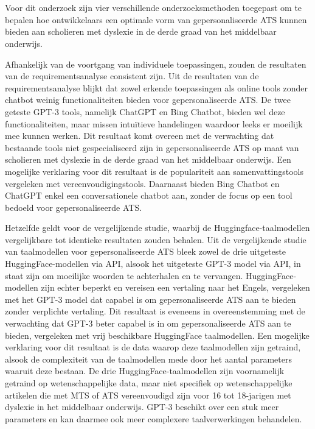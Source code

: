 
\chapter{}%
\label{ch:discussie}




Voor dit onderzoek zijn vier verschillende onderzoeksmethoden toegepast om te bepalen hoe ontwikkelaars een optimale vorm van gepersonaliseerde ATS kunnen bieden aan scholieren met dyslexie in de derde graad van het middelbaar onderwijs.  

Afhankelijk van de voortgang van individuele toepassingen, zouden de resultaten van de requirementsanalyse consistent zijn. Uit de resultaten van de requirementsanalyse blijkt dat zowel erkende toepassingen als online tools zonder chatbot weinig functionaliteiten bieden voor gepersonaliseerde ATS. De twee geteste GPT-3 tools, namelijk ChatGPT en Bing Chatbot, bieden wel deze functionaliteiten, maar missen intuïtieve handelingen waardoor leeks er moeilijk mee kunnen werken. Dit resultaat komt overeen met de verwachting dat bestaande tools niet gespecialiseerd zijn in gepersonaliseerde ATS op maat van scholieren met dyslexie in de derde graad van het middelbaar onderwijs. Een mogelijke verklaring voor dit resultaat is de populariteit aan samenvattingstools vergeleken met vereenvoudigingstools. Daarnaast bieden Bing Chatbot en ChatGPT enkel een conversationele chatbot aan, zonder de focus op een tool bedoeld voor gepersonaliseerde ATS.

\medspace

Hetzelfde geldt voor de vergelijkende studie, waarbij de Huggingface-taalmodellen vergelijkbare tot identieke resultaten zouden behalen. Uit de vergelijkende studie van taalmodellen voor gepersonaliseerde ATS bleek zowel de drie uitgeteste HuggingFace-modellen via API, alsook het uitgeteste GPT-3 model via API, in staat zijn om moeilijke woorden te achterhalen en te vervangen. HuggingFace-modellen zijn echter beperkt en vereisen een vertaling naar het Engels, vergeleken met het GPT-3 model dat capabel is om gepersonaliseerde ATS aan te bieden zonder verplichte vertaling. Dit resultaat is eveneens in overeenstemming met de verwachting dat GPT-3 beter capabel is in om gepersonaliseerde ATS aan te bieden, vergeleken met vrij beschikbare HuggingFace taalmodellen. Een mogelijke verklaring voor dit resultaat is de data waarop deze taalmodellen zijn getraind, alsook de complexiteit van de taalmodellen mede door het aantal parameters waaruit deze bestaan. De drie HuggingFace-taalmodellen zijn voornamelijk getraind op wetenschappelijke data, maar niet specifiek op wetenschappelijke artikelen die met MTS of ATS vereenvoudigd zijn voor 16 tot 18-jarigen met dyslexie in het middelbaar onderwijs. GPT-3 beschikt over een stuk meer parameters en kan daarmee ook meer complexere taalverwerkingen behandelen. 

